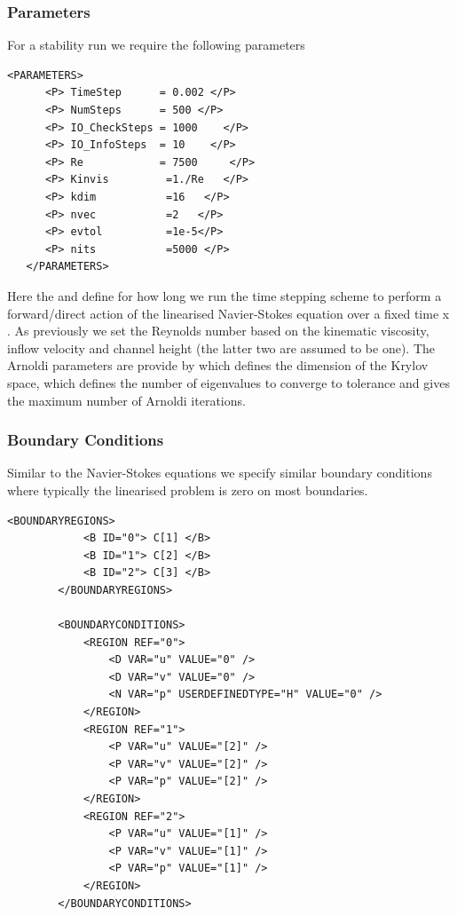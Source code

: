 \subsubsection*{Parameters}

For a stability run we require the following parameters


    \begin{lstlisting}[style=XMLStyle]
<PARAMETERS>
      <P> TimeStep      = 0.002 </P>
      <P> NumSteps      = 500 </P>
      <P> IO_CheckSteps = 1000    </P>
      <P> IO_InfoSteps  = 10    </P>
      <P> Re            = 7500     </P>
      <P> Kinvis         =1./Re   </P>
      <P> kdim           =16   </P>
      <P> nvec           =2   </P>
      <P> evtol          =1e-5</P>
      <P> nits           =5000 </P>
   </PARAMETERS>
\end{lstlisting}

    Here the  and  define for how long
    we run the time stepping scheme to perform a forward/direct action
    of the linearised Navier-Stokes equation over a fixed time
     x . As previously we set the
    Reynolds number based on the kinematic viscosity, inflow velocity
    and channel height (the latter two are assumed to be one). The
    Arnoldi parameters are provide by  which defines the
    dimension of the Krylov space,  which defines the
    number of eigenvalues to converge to tolerance  and
     gives the maximum number of Arnoldi iterations.

\subsubsection*{Boundary Conditions}

Similar to the Navier-Stokes equations we specify similar boundary
conditions where typically the linearised problem is zero on most
boundaries.

    \begin{lstlisting}[style=XMLStyle]
 <BOUNDARYREGIONS>
            <B ID="0"> C[1] </B>
            <B ID="1"> C[2] </B>
            <B ID="2"> C[3] </B>
        </BOUNDARYREGIONS>

        <BOUNDARYCONDITIONS>
            <REGION REF="0">
                <D VAR="u" VALUE="0" />
                <D VAR="v" VALUE="0" />
                <N VAR="p" USERDEFINEDTYPE="H" VALUE="0" />
            </REGION>
            <REGION REF="1">
                <P VAR="u" VALUE="[2]" />
                <P VAR="v" VALUE="[2]" />
                <P VAR="p" VALUE="[2]" />
            </REGION>
            <REGION REF="2">
                <P VAR="u" VALUE="[1]" />
                <P VAR="v" VALUE="[1]" />
                <P VAR="p" VALUE="[1]" />
            </REGION>
        </BOUNDARYCONDITIONS>
                 \end{lstlisting}

